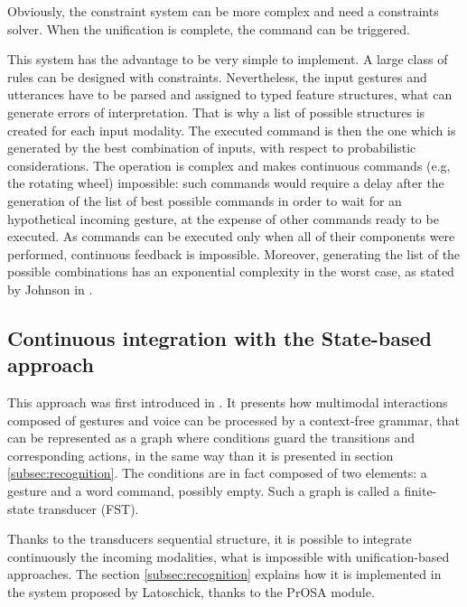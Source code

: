 \documentclass[a4paper]{article}
\begin{document}
Obviously, the constraint system can be more complex and need a constraints solver. When the unification is complete, the command can be triggered.

This system has the advantage to be very simple to implement. A large class of rules can be designed with constraints. Nevertheless, the input gestures and utterances have to be parsed and assigned to typed feature structures, what can generate errors of interpretation. That is why a list of possible structures is created for each input modality. The executed command is then the one which is generated by the best combination of inputs, with respect to probabilistic considerations. The operation is complex and makes continuous commands (e.g, the rotating wheel) impossible: such commands would require a delay after the generation of the list of best possible commands in order to wait for an hypothetical incoming gesture, at the expense of other commands ready to be executed. As commands can be executed only when all of their components were performed, continuous feedback is impossible. Moreover, generating the list of the possible combinations has an exponential complexity in the worst case, as stated by Johnson in \cite{state-based}.

\subsection{Continuous integration with the State-based approach}
This approach was first introduced in \cite{state-based}. It presents how multimodal interactions composed of gestures and voice can be processed by a context-free grammar, that can be represented as a graph where conditions guard the transitions and corresponding actions, in the same way than it is presented in section \ref{subsec:recognition}. The conditions are in fact composed of two elements: a gesture and a word command, possibly empty. Such a graph is called a finite-state transducer (FST).

Thanks to the transducers sequential structure, it is possible to integrate continuously the incoming modalities, what is impossible with unification-based approaches. The section \ref{subsec:recognition} explains how it is implemented in the system proposed by Latoschick, thanks to the PrOSA module.
\end{document}
